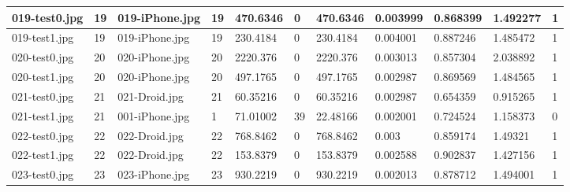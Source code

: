 \begin{landscape}
\begin{longtable}{|p{2cm}|p{1cm}|p{2cm}|p{1cm}|p{2cm}|p{1cm}|p{2cm}|p{2cm}|p{2cm}|p{2cm}|p{1cm}|}
		019-test0.jpg   & 19               & 019-iPhone.jpg        & 19                          & 470.6346              & 0                       & 470.6346                   & 0.003999              & 0.868399              & 1.492277                 & 1                \\ \hline
		019-test1.jpg   & 19               & 019-iPhone.jpg        & 19                          & 230.4184              & 0                       & 230.4184                   & 0.004001              & 0.887246              & 1.485472                 & 1                \\ \hline
		020-test0.jpg   & 20               & 020-iPhone.jpg        & 20                          & 2220.376              & 0                       & 2220.376                   & 0.003013              & 0.857304              & 2.038892                 & 1                \\ \hline
		020-test1.jpg   & 20               & 020-iPhone.jpg        & 20                          & 497.1765              & 0                       & 497.1765                   & 0.002987              & 0.869569              & 1.484565                 & 1                \\ \hline
		021-test0.jpg   & 21               & 021-Droid.jpg         & 21                          & 60.35216              & 0                       & 60.35216                   & 0.002987              & 0.654359              & 0.915265                 & 1                \\ \hline
		021-test1.jpg   & 21               & 001-iPhone.jpg        & 1                           & 71.01002              & 39                      & 22.48166                   & 0.002001              & 0.724524              & 1.158373                 & 0                \\ \hline
		022-test0.jpg   & 22               & 022-Droid.jpg         & 22                          & 768.8462              & 0                       & 768.8462                   & 0.003                 & 0.859174              & 1.49321                  & 1                \\ \hline
		022-test1.jpg   & 22               & 022-Droid.jpg         & 22                          & 153.8379              & 0                       & 153.8379                   & 0.002588              & 0.902837              & 1.427156                 & 1                \\ \hline
		023-test0.jpg   & 23               & 023-iPhone.jpg        & 23                          & 930.2219              & 0                       & 930.2219                   & 0.002013              & 0.878712              & 1.494001                 & 1                \\ \hline

\end{longtable}
\end{landscape}
